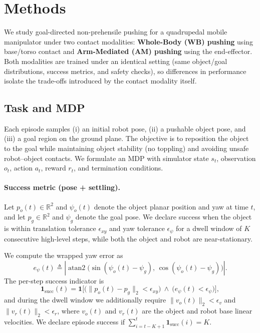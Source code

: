 \section{Methods}
\label{sec:methods}

We study goal-directed non-prehensile pushing for a quadrupedal mobile manipulator under two contact modalities:
\textbf{Whole-Body (WB) pushing} using base/torso contact and \textbf{Arm-Mediated (AM) pushing} using the end-effector.
Both modalities are trained under an identical setting (same object/goal distributions, success metrics, and safety checks),
so differences in performance isolate the trade-offs introduced by the contact modality itself.

\subsection{Task and MDP}
\label{sec:mdp}
Each episode samples (i) an initial robot pose, (ii) a pushable object pose, and (iii) a goal region on the ground plane.
The objective is to reposition the object to the goal while maintaining object stability (no toppling) and avoiding unsafe robot--object contacts.
We formulate an MDP with simulator state $s_t$, observation $o_t$, action $a_t$, reward $r_t$, and termination conditions.
\paragraph{Success metric (pose + settling).}
Let $p_o(t)\in\mathbb{R}^2$ and $\psi_o(t)$ denote the object planar position and yaw at time $t$, and let $p_g\in\mathbb{R}^2$ and $\psi_g$ denote the goal pose.
We declare success when the object is within translation tolerance $\epsilon_{xy}$ and yaw tolerance $\epsilon_{\psi}$ for a dwell window of $K$ consecutive high-level steps,
while both the object and robot are near-stationary.

We compute the wrapped yaw error as
\begin{equation}
\label{eq:yaw_error}
e_{\psi}(t)\triangleq \left|\operatorname{atan2}\!\Big(\sin(\psi_o(t)-\psi_g),\,\cos(\psi_o(t)-\psi_g)\Big)\right|.
\end{equation}
The per-step success indicator is
\begin{equation}
\label{eq:succ_step}
\mathbf{1}_{\text{succ}}(t)=
\mathbf{1}\!\Big[
\big(\|p_o(t)-p_g\|_2<\epsilon_{xy}\big)\ \wedge\ \big(e_{\psi}(t)<\epsilon_{\psi}\big)
\Big],
\end{equation}
and during the dwell window we additionally require $\|v_o(t)\|_2<\epsilon_v$ and $\|v_r(t)\|_2<\epsilon_r$,
where $v_o(t)$ and $v_r(t)$ are the object and robot base linear velocities.
We declare episode success if $\sum_{i=t-K+1}^{t}\mathbf{1}_{\text{succ}}(i)=K$.


